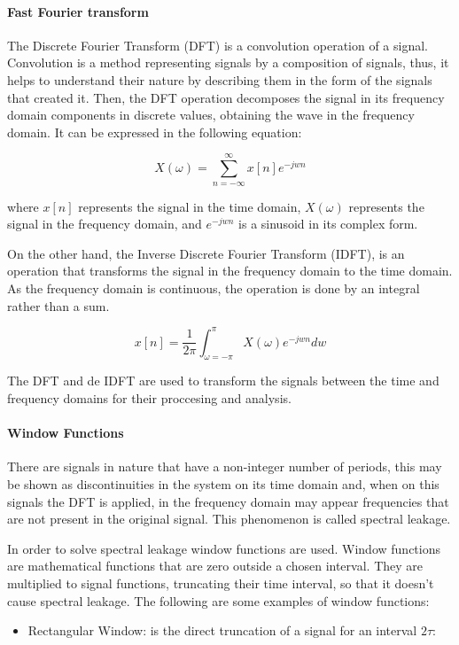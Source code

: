 {{{{{\paragraph{Fast Fourier transform}

The Discrete Fourier Transform (DFT) is a convolution operation of a signal. Convolution is a method representing signals by a composition of signals, thus, it helps to understand their nature by describing them in the form of the signals that created it. Then, the DFT operation decomposes the signal in its frequency domain components in discrete values, obtaining the wave in the frequency domain. It can be expressed in the following equation:

$$X(\omega) = \sum_{n = - \infty}^{\infty} x[n]e^{-jwn}$$

where $x[n]$ represents the signal in the time domain, $X(\omega)$ represents the signal in the frequency domain, and $e^{-jwn}$ is a sinusoid in its complex form.

On the other hand, the Inverse Discrete Fourier Transform (IDFT), is an operation that transforms the signal in the frequency domain to the time domain. As the frequency domain is continuous, the operation is done by an integral rather than a sum.

$$ x[n]= \frac{1}{2\pi}\int_{\omega = - \pi}^{\pi} X(\omega)e^{-jwn} dw$$

The DFT and de IDFT are used to transform the signals between the time and frequency domains for their proccesing and analysis.

\paragraph{Window Functions}
 There are signals in nature that have a non-integer number of periods, this may be shown as discontinuities in the system on its time domain and, when on this signals the DFT is applied, in the frequency domain may appear frequencies that are not present in the original signal. This phenomenon is called spectral leakage. 

 In order to solve spectral leakage window functions are used. Window functions are mathematical functions that are zero outside a chosen interval. They are multiplied to signal functions, truncating their time interval, so that it doesn't cause spectral leakage.  The following are some examples of window functions:
\begin{itemize}
    \item Rectangular Window: is the direct truncation of a signal for an interval $2\tau$:


\end{itemize}}}}}}
